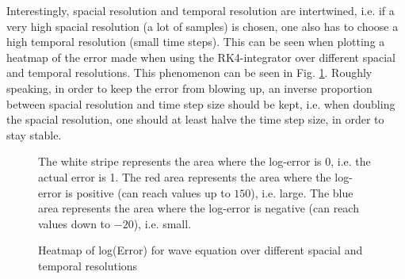 Interestingly, spacial resolution and temporal resolution are intertwined, i.e. if a very high spacial resolution (a lot of samples) is chosen, one also has to choose a high temporal resolution (small time steps).
This can be seen when plotting a heatmap of the error made when using the RK4-integrator over different spacial and temporal resolutions.
This phenomenon can be seen in Fig. \ref{fig:heatmap_wave_eq_step_size_numgridpoints}.
Roughly speaking, in order to keep the error from blowing up, an inverse proportion between spacial resolution and time step size should be kept, i.e. when doubling the spacial resolution, one should at least halve the time step size, in order to stay stable.

\begin{figure}[!h]
    \caption{Heatmap of log(Error) for wave equation over different spacial and temporal resolutions}
    \label{fig:heatmap_wave_eq_step_size_numgridpoints}
	\small
The white stripe represents the area where the log-error is 0, i.e. the actual error is 1.
The red area represents the area where the log-error is positive (can reach values up to $150$), i.e. large.
The blue area represents the area where the log-error is negative (can reach values down to $-20$), i.e. small.
\end{figure}





